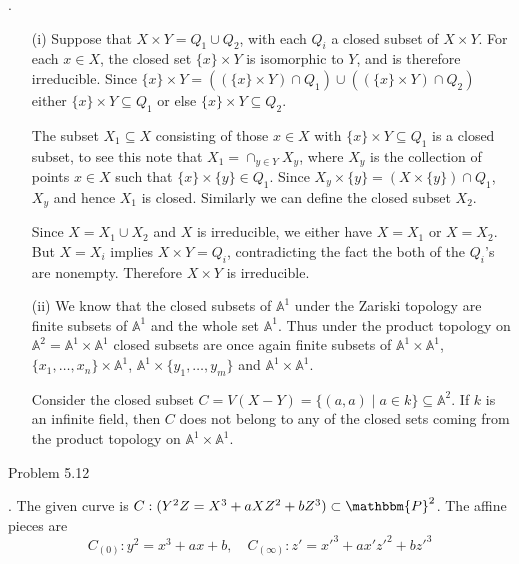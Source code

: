 \documentclass[12pt]{article}
\begin{document}
    \sol.
    \begin{enumerate}
        \item[(i)] Suppose that $X \times Y = Q_1 \cup Q_2$, with each $Q_i$ a closed subset of $X \times Y$.
        For each $x \in X$, the closed set $\{x\} \times Y$ is isomorphic to $Y$, and is therefore irreducible.
        Since $\{x\} \times Y= ((\{x\} \times Y) \cap Q_1) \cup ((\{x\} \times Y ) \cap Q_2)$ either $\{x\} \times Y \subseteq Q_1$ or else $\{x\} \times Y \subseteq Q_2$.
    
        The subset $X_1 \subseteq X$ consisting of those $x \in X$ with $\{x\} \times Y \subseteq Q_1$ is a closed subset, to see this note that $X_1 = \cap_{y \in Y} X_y$, where $X_y$ is the collection of points $x \in X$ such that $\{x\} \times \{y\} \in Q_1$. Since $X_y \times \{y\} = (X \times \{y\}) \cap Q_1$, $X_y$ and hence $X_1$ is closed. Similarly we can define the closed subset $X_2$. 
        
        Since $X = X_1 \cup X_2$ and $X$ is irreducible, we either have $X = X_1$ or $X = X_2$. But $X = X_i$ implies $X \times Y = Q_i$, contradicting the fact the both of the $Q_i$'s are nonempty. Therefore $X \times Y$ is irreducible.
        
        \item[(ii)] We know that the closed subsets of $\mathbb{A}^1$ under the Zariski topology are finite subsets of $\mathbb{A}^1$ and the whole set $\mathbb{A}^1$. Thus under the product topology on $\mathbb{A}^2 = \mathbb{A}^1 \times \mathbb{A}^1$ closed subsets are once again finite subsets of $\mathbb{A}^1 \times \mathbb{A}^1$, $\{x_1,\dots,x_n\} \times \mathbb{A}^1$, $\mathbb{A}^1 \times \{y_1,\dots,y_m\}$ and $\mathbb{A}^1 \times \mathbb{A}^1$.
        
        Consider the closed subset $C = V(X-Y) = \{(a,a) \mid a \in k\} \subseteq \mathbb{A}^2$. If $k$ is an infinite field, then $C$ does not belong to any of the closed sets coming from the product topology on $\mathbb{A}^1 \times \mathbb{A}^1$. 
    \end{enumerate}

\begin{prob}
    Problem 5.12
\end{prob}

\sol. The given curve is \( C: (Y^2Z = X^3 + aXZ^2 + bZ^3) \subset \mathbbm{P}^2 \). The affine pieces are
\[
    C_{(0)}: y^2 = x^3+ax+b, \quad C_{(\infty)}: z' = x'^3+ax'z'^2+bz'^3
\]
\end{document}
